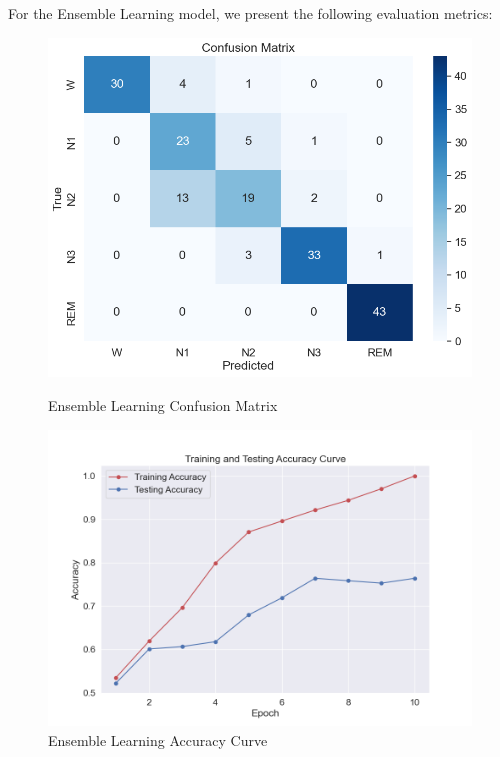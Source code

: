 For the Ensemble Learning model, we present the following evaluation metrics:

\begin{figure}[H]
	\centering
	\begin{minipage}[b]{0.45\textwidth}
		\centering
		\includegraphics[width=\textwidth]{img/paper_1//Ensemble_confusion_matrix.png}
		\caption{Ensemble Learning Confusion Matrix}
	\end{minipage}
	\hfill
	\begin{minipage}[b]{0.45\textwidth}
		\centering
		\includegraphics[width=\textwidth]{img/paper_1//accuracy_curve.png}
		\caption{Ensemble Learning Accuracy Curve}
	\end{minipage}
	

\end{figure}

